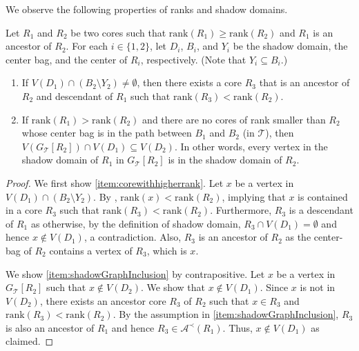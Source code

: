 \documentclass{theoretics}
\newcommand{\mt}{\mathcal{T}}
\newcommand{\rank}{\mathrm{rank}}
\def\core{R}
\def\centre{Y}
\begin{document}
We observe the following properties of ranks and shadow domains.


\begin{lemma} \label{lemma:cores}
	Let $\core_1$ and $\core_2$ be two cores such that $ \rank(\core_1)\geq \rank(\core_2)$ and $\core_1$ is an ancestor of $\core_2$. For each $i\in \{1,2\}$, let $D_i$, $B_i$, and $Y_i$ be the shadow domain, the center bag, and the center of $R_i$, respectively. (Note that $Y_i\subseteq B_i$.) 
	\begin{enumerate}
		\item \label{item:corewithhigherrank} If $V(D_1) \cap (B_2\setminus \centre_2)\not= \emptyset$, then there exists a  core $\core_3$ that is an ancestor of $\core_2$ and descendant of $\core_1$  such that $\rank(\core_3) < \rank(\core_2)$.
		\item \label{item:shadowGraphInclusion} If  $ \rank(\core_1) > \rank(\core_2)$ and there are no cores of rank smaller than $\core_2$ whose center bag is in the path between $B_1$ and $B_2$ (in $\mt$), then $V(G_{\mt}[\core_2])\cap V(D_1) \subseteq V(D_2)$. In other words,  every vertex in the shadow domain of $\core_1$ in $G_{\mt}[\core_2]$ is in the shadow domain of $\core_2$.
	\end{enumerate}
\end{lemma}
\begin{proof} We first show \cref{item:corewithhigherrank}. Let $x$ be a vertex in $V(D_1)\cap (B_2\setminus \centre_2)$. By , $\rank(x) < \rank(\core_2)$, implying that $x$ is contained in a core $\core_3$ such that $\rank(\core_3) < \rank(\core_2)$.  Furthermore, $\core_3$ is a descendant of $\core_1$ as otherwise, by the definition of shadow domain, $\core_3\cap V(D_1) = \emptyset$ and hence $x\not\in V(D_1)$, a contradiction. Also, $\core_3$ is an ancestor of $\core_2$ as the center-bag of $\core_2$ contains a vertex of $\core_3$, which is $x$. 
	
	We show \cref{item:shadowGraphInclusion} by contrapositive. Let $x$ be a vertex in $G_{\mt}[\core_2]$ such that  $x \not\in V(D_2)$. We show that $x \not\in V(D_1)$. Since $x$ is not in $V(D_2)$,  there exists an ancestor core  $\core_3$ of $\core_2$ such that $x\in \core_3$ and $\rank(\core_3) < \rank(\core_2)$. By the assumption in \cref{item:shadowGraphInclusion}, $\core_3$ is also an ancestor of $\core_1$ and hence $R_3\in \mathcal{A}^{\prec}(R_1)$. Thus,  $x \not \in V(D_1)$ as claimed. 
\end{proof}
\end{document}
